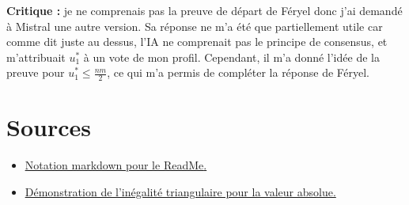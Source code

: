 \documentclass[11pt]{article}
\begin{document}
\textbf{Critique :} je ne comprenais pas la preuve de départ de Féryel donc j'ai demandé à Mistral une autre version. Sa réponse ne m'a été que partiellement utile car comme dit juste au dessus, l'IA ne comprenait pas le principe de consensus, et m'attribuait $u_1^*$ à un vote de mon profil. Cependant, il m'a donné l'idée de la preuve pour $u_1^* \leq \frac{nm}{2}$, ce qui m'a permis de compléter la réponse de Féryel.  

\section{Sources}


\begin{itemize}
	\item \underline{\href{http://pingouindesalpes.com/hugo/post/markdown/}{Notation markdown pour le ReadMe}.}
	\item \underline{\href{https://share.miple.co/content/6IggazU5m0tIG
}{Démonstration de l’inégalité triangulaire pour la valeur absolue}.}
\end{itemize}
\end{document}
